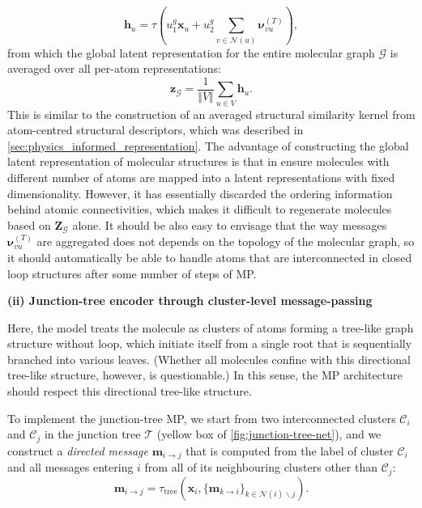 \begin{myquote}
\begin{equation*}
    \bm{h}_u=\tau\left( u_1^g\bm{x}_u + u_2^g\sum_{v\in\mathcal{N}(u)} \boldsymbol{\nu}^{(T)}_{vu}\right),
\end{equation*}
from which the global latent representation for the entire molecular graph $\mathcal{G}$ is averaged over all per-atom representations:
\begin{equation*}
    \bm{z}_{\mathcal{G}}=\frac{1}{\Vert V\Vert}\sum_{u\in V}\bm{h}_{u}.
\end{equation*}
This is similar to the construction of an averaged structural similarity kernel from atom-centred structural descriptors,\cite{de2016comparing} which was described in \cref{sec:physics_informed_representation}. The advantage of constructing the global latent representation of molecular structures is that in ensure molecules with different number of atoms are mapped into a latent representations with fixed dimensionality. However, it has essentially discarded the ordering information behind atomic connectivities, which makes it difficult to regenerate molecules based on $\bm{Z}_{\mathcal{G}}$ alone. It should be also easy to envisage that the way messages $\boldsymbol{\nu}^{(T)}_{vu}$ are aggregated does not depends on the topology of the molecular graph, so it should automatically be able to handle atoms that are interconnected in closed loop structures after some number of steps of MP.

\textbf{(ii) Junction-tree encoder through cluster-level message-passing}

\hspace{10pt} Here, the model treats the molecule as  clusters of atoms forming a tree-like graph structure without loop, which initiate itself from a single root that is sequentially branched into various leaves. (Whether all molecules confine with this directional tree-like structure, however, is questionable.) In this sense, the MP architecture should respect this directional tree-like structure.  

\hspace{10pt} To implement the junction-tree MP, we start from two interconnected clusters $\mathcal{C}_{i}$ and $\mathcal{C}_j$ in the junction tree $\mathcal{T}$ (yellow box of \cref{fig:junction-tree-net}), and we construct a \emph{directed message} $\bm{m}_{i\to j}$ that is computed from the label of cluster $\mathcal{C}_i$ and all messages entering $i$ from all of its neighbouring clusters other than $\mathcal{C}_j$:
\begin{equation*}
    \bm{m}_{i\to j}=\tau_{\mathrm{tree}}\left(\bm{x}_{i},\Big\{ \bm{m}_{k\to i} \Big\}_{k\in\mathcal{N}(i)\backslash j} \right).
\end{equation*}


\end{myquote}
